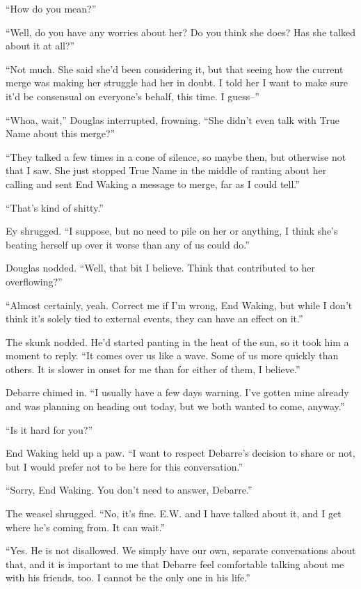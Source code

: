 ``How do you mean?''

``Well, do you have any worries about her? Do you think she does? Has she talked about it at all?''

``Not much. She said she'd been considering it, but that seeing how the current merge was making her struggle had her in doubt. I told her I want to make sure it'd be consensual on everyone's behalf, this time. I guess--''

``Whoa, wait,'' Douglas interrupted, frowning. ``She didn't even talk with True Name about this merge?''

``They talked a few times in a cone of silence, so maybe then, but otherwise not that I saw. She just stopped True Name in the middle of ranting about her calling and sent End Waking a message to merge, far as I could tell.''

``That's kind of shitty.''

Ey shrugged. ``I suppose, but no need to pile on her or anything, I think she's beating herself up over it worse than any of us could do.''

Douglas nodded. ``Well, that bit I believe. Think that contributed to her overflowing?''

``Almost certainly, yeah. Correct me if I'm wrong, End Waking, but while I don't think it's solely tied to external events, they can have an effect on it.''

The skunk nodded. He'd started panting in the heat of the sun, so it took him a moment to reply. ``It comes over us like a wave. Some of us more quickly than others. It is slower in onset for me than for either of them, I believe.''

Debarre chimed in. ``I usually have a few days warning. I've gotten mine already and was planning on heading out today, but we both wanted to come, anyway.''

``Is it hard for you?''

End Waking held up a paw. ``I want to respect Debarre's decision to share or not, but I would prefer not to be here for this conversation.''

``Sorry, End Waking. You don't need to answer, Debarre.''

The weasel shrugged. ``No, it's fine. E.W. and I have talked about it, and I get where he's coming from. It can wait.''

``Yes. He is not disallowed. We simply have our own, separate conversations about that, and it is important to me that Debarre feel comfortable talking about me with his friends, too. I cannot be the only one in his life.''

